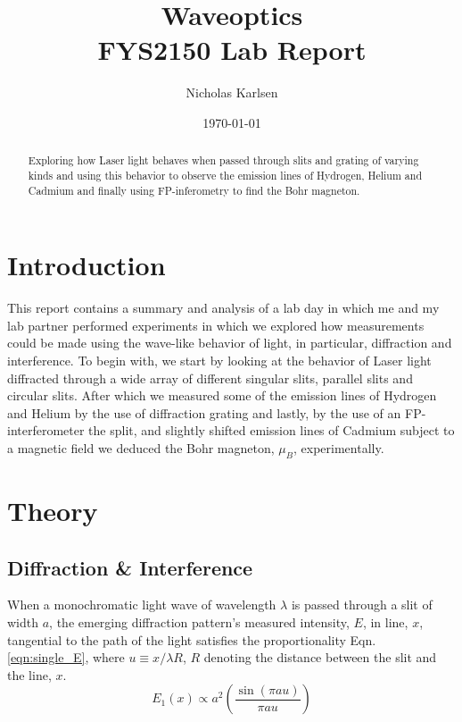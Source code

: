 \documentclass[11pt,a4paper]{article}
\begin{document}
\title{Waveoptics\\
\normalsize{FYS2150 Lab Report}}

\author{Nicholas Karlsen}

\date{\today}%

\maketitle

\begin{abstract}
  Exploring how Laser light behaves when passed through slits and grating of varying kinds and using this behavior to observe the emission lines of Hydrogen, Helium and Cadmium and finally using FP-inferometry to find the Bohr magneton.
\end{abstract}


\section{\label{sect:intro}Introduction}
  This report contains a summary and analysis of a lab day in which me and my lab partner performed experiments in which we explored how measurements could be made using the wave-like behavior of light, in particular, diffraction and interference.
  To begin with, we start by looking at the behavior of Laser light diffracted through a wide array of different singular slits, parallel slits and circular slits. After which we measured some of the emission lines of Hydrogen and Helium by the use of diffraction grating and lastly, by the use of an FP-interferometer the split, and slightly shifted emission lines of Cadmium subject to a magnetic field we deduced the Bohr magneton, $\mu_B$, experimentally.

\section{\label{sect:theory}Theory}
  \subsection{Diffraction \& Interference}
    When a monochromatic light wave of wavelength $\lambda$ is passed through a slit of width $a$, the emerging diffraction pattern's measured intensity, $E$, in line, $x$, tangential to the path of the light satisfies the proportionality Eqn. \ref{eqn:single_E}, where $u \equiv x / \lambda R$, $R$ denoting the distance between the slit and the line, $x$.
    \begin{equation}
      E_1(x) \propto a^2 \left( \frac{\sin(\pi a u)}{\pi a u} \right)
      \label{eqn:single_E}
    \end{equation}
\end{document}
